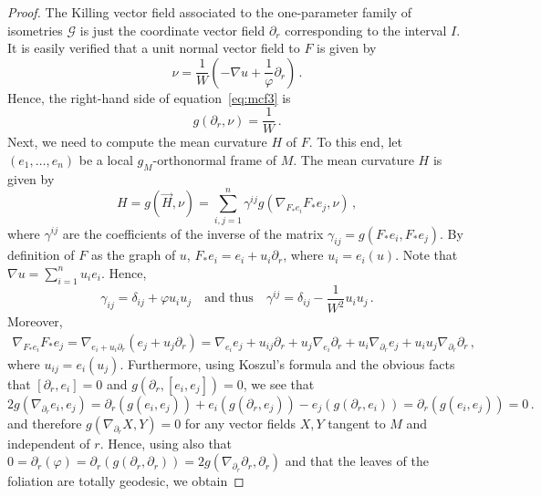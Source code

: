 \documentclass[oneside,12pt]{amsart}
\theoremstyle{definition}
\begin{document}
\begin{proof}
The Killing vector field associated to the one-parameter family of isometries $\mathcal{G}$ is just the coordinate vector field $\partial_r$ corresponding to the interval $I$. It is easily verified that a unit normal vector field to $F$ is given by
\begin{equation*}
\nu = \frac{1}{W} \left( - \nabla u + \frac{1}{\varphi} \partial_r \right) \, .
\end{equation*}
Hence, the right-hand side of equation~\eqref{eq:mcf3} is
\begin{equation}\label{eq:Knu}
g \left( \partial_r , \nu \right) = \frac{1}{W} \, .
\end{equation}
Next, we need to compute the mean curvature $H$ of $F$. To this end, let $(e_1 , \dots , e_n)$ be a local $g_M$-orthonormal frame of $M$. The mean curvature $H$ is given by
\begin{equation*}
H = g \left( \vec{H} , \nu \right) = \sum_{i,j=1}^{n} \gamma^{ij} g \left( \nabla_{F_* e_i} F_* e_j , \nu \right) \, ,
\end{equation*}
where $\gamma^{ij}$ are the coefficients of the inverse of the matrix $\gamma_{ij} = g \left( F_* e_i , F_* e_j \right)$. By definition of $F$ as the graph of $u$, $F_* e_i = e_i + u_i \partial_r$, where $u_i = e_i(u)$. Note that $\nabla u = \sum_{i=1}^{n} u_i e_i$. Hence,
\begin{equation*}
    \gamma_{ij} = \delta_{ij} + \varphi u_i u_j \quad \text{and thus} \quad \gamma^{ij} = \delta_{ij} - \frac{1}{W^2} u_i u_j \, .
\end{equation*}
Moreover,
\begin{align*}
    \nabla_{F_* e_i} F_* e_j = \nabla_{e_i + u_i \partial_r} \left( e_j + u_j \partial_r \right) = \nabla_{e_i} e_j + u_{ij} \partial_r + u_j \nabla_{e_i} \partial_r + u_i \nabla_{\partial_r} e_j + u_i u_j \nabla_{\partial_r} \partial_r \, ,
\end{align*}
where $u_{ij} = e_i(u_j)$. Furthermore, using Koszul's formula and the obvious facts that $[\partial_r,e_i] = 0$ and $g(\partial_r,[e_i,e_j]) = 0$, we see that
\[
2g\left(\nabla_{\partial_r} e_i,e_j\right)
=\partial_r\left(g\left(e_i,e_j\right)\right)
+e_i(g\left(\partial_r,e_j\right))-e_j(g\left(\partial_r,e_i\right))
 =\partial_r\left( g\left(e_i,e_j\right)\right)=0 \, .
\]
and therefore $g(\nabla_{\partial_r} X,Y)=0$ for any vector fields $X,Y$ tangent to $M$ and independent of $r$. Hence, using also that $0 = \partial_r(\varphi) = \partial_r(g(\partial_r,\partial_r))=2g(\nabla_{\partial_r} \partial_r,\partial_r)$ and that the leaves of the foliation are totally geodesic, we obtain

\end{proof}
\end{document}
